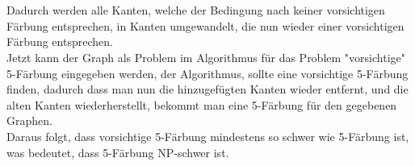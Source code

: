 \documentclass[a4paper,11pt,oneside]{scrartcl}
\begin{document}
\\\\
Dadurch werden alle Kanten, welche der Bedingung nach keiner vorsichtigen Färbung entsprechen,  in Kanten umgewandelt, die nun wieder einer vorsichtigen Färbung entsprechen.\\
Jetzt kann der Graph als Problem im Algorithmus für das Problem "vorsichtige" 5-Färbung eingegeben werden, der Algorithmus, sollte eine vorsichtige 5-Färbung finden,
dadurch dass man nun die hinzugefügten Kanten wieder entfernt, und die alten Kanten wiederherstellt, bekommt man eine 5-Färbung für den gegebenen Graphen.\\
Daraus folgt, dass vorsichtige 5-Färbung mindestens so schwer wie 5-Färbung ist, was bedeutet, dass 5-Färbung NP-schwer ist.
\end{document}
